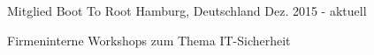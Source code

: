 

\begin{cventries}

  \cventry
    {Mitglied} %
    {Boot To Root} %
    {Hamburg, Deutschland} %
    {Dez. 2015 - aktuell} %
    {
      \begin{cvitems} %
        \item {Firmeninterne Workshops zum Thema IT-Sicherheit}
      \end{cvitems}
    }

\end{cventries}
